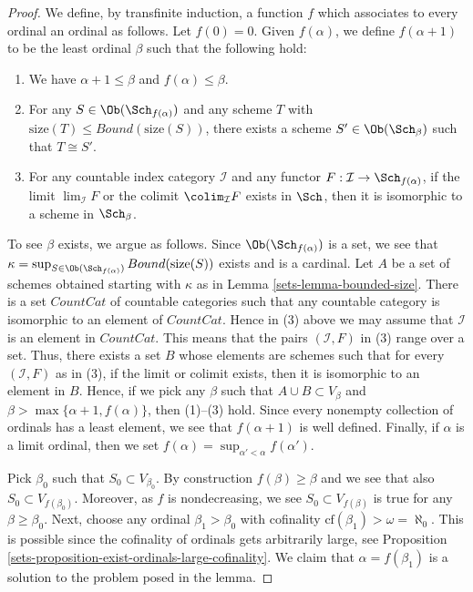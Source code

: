 \begin{proof}

We define, by transfinite induction, a function $f$ which associates
to every ordinal an ordinal as follows. Let $f(0) = 0$.
Given $f(\alpha)$, we define $f(\alpha + 1)$ to be the least
ordinal $\beta$ such that the following hold:
\begin{enumerate}
\item We have $\alpha + 1 \leq \beta$ and $f(\alpha) \leq \beta$.
\item For any $S \in \Ob(\Sch_{f(\alpha)})$ and any
scheme $T$ with $\text{size}(T) \leq Bound(\text{size}(S))$,
there exists a scheme $S' \in \Ob(\Sch_\beta)$
such that $T \cong S'$.
\item For any countable index category $\mathcal{I}$ and
any functor $F : \mathcal{I} \to \Sch_{f(\alpha)}$, if
the limit $\lim_\mathcal{I} F$ or the colimit
$\colim_\mathcal{I} F$ exists in $\Sch$,
then it is isomorphic to a scheme in $\Sch_\beta$.
\end{enumerate}
To see $\beta$ exists, we argue as follows. Since
$\Ob(\Sch_{f(\alpha)})$ is a set, we see that
$\kappa =
\sup_{S \in \Ob(\Sch_{f(\alpha)})} Bound(\text{size}(S))$
exists and is a cardinal.
Let $A$ be a set of schemes obtained starting with $\kappa$
as in Lemma \ref{sets-lemma-bounded-size}.
There is a set $CountCat$ of countable
categories such that any countable category is isomorphic to
an element of $CountCat$. Hence in (3) above we may assume
that $\mathcal{I}$ is an element in $CountCat$. This means that
the pairs $(\mathcal{I}, F)$ in (3) range over a set.
Thus, there exists a set $B$ whose elements are schemes
such that for every $(\mathcal{I}, F)$ as in (3), if the
limit or colimit exists, then it is isomorphic to an element in $B$.
Hence, if we pick any $\beta$ such that $A \cup B \subset V_\beta$
and $\beta > \max\{\alpha + 1, f(\alpha)\}$, then (1)--(3) hold.
Since every nonempty collection of ordinals has a least element,
we see that $f(\alpha + 1)$ is well defined. Finally, if $\alpha$
is a limit ordinal, then we set
$f(\alpha) = \sup_{\alpha' < \alpha} f(\alpha')$.

\medskip\noindent
Pick $\beta_0$ such that $S_0 \subset V_{\beta_0}$.
By construction $f(\beta) \geq \beta$ and we see that
also $S_0 \subset V_{f(\beta_0)}$. Moreover, as $f$ is
nondecreasing, we see $S_0 \subset V_{f(\beta)}$ is true for any
$\beta \geq \beta_0$.
Next, choose any ordinal $\beta_1 > \beta_0$ with cofinality
$\text{cf}(\beta_1) > \omega = \aleph_0$. This is possible
since the cofinality of ordinals gets arbitrarily large, see
Proposition \ref{sets-proposition-exist-ordinals-large-cofinality}.
We claim that
$\alpha = f(\beta_1)$ is a solution to the problem posed in the lemma.


\end{proof}
